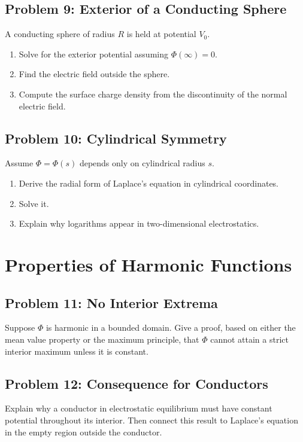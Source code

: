\documentclass[hidelinks]{article}
\begin{document}
\subsection{Problem 9: Exterior of a Conducting Sphere}
A conducting sphere of radius $R$ is held at potential $V_0$.
\begin{enumerate}[label=\alph*)]
\item Solve for the exterior potential assuming $\Phi(\infty)=0$.
\item Find the electric field outside the sphere.
\item Compute the surface charge density from the discontinuity of the normal electric field.
\end{enumerate}

\subsection{Problem 10: Cylindrical Symmetry}
Assume $\Phi=\Phi(s)$ depends only on cylindrical radius $s$.
\begin{enumerate}[label=\alph*)]
\item Derive the radial form of Laplace's equation in cylindrical coordinates.
\item Solve it.
\item Explain why logarithms appear in two-dimensional electrostatics.
\end{enumerate}

\section{Properties of Harmonic Functions}
\subsection{Problem 11: No Interior Extrema}
Suppose $\Phi$ is harmonic in a bounded domain. Give a proof, based on either the mean value property or the maximum principle, that $\Phi$ cannot attain a strict interior maximum unless it is constant.

\subsection{Problem 12: Consequence for Conductors}
Explain why a conductor in electrostatic equilibrium must have constant potential throughout its interior. Then connect this result to Laplace's equation in the empty region outside the conductor.
\end{document}
